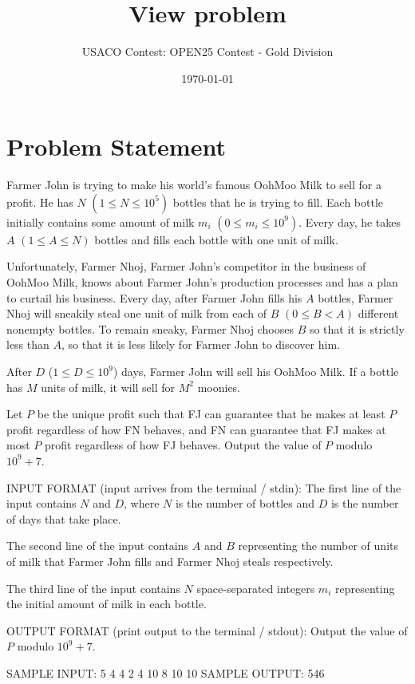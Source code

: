 \documentclass[12pt]{article}
\title{View problem}
\author{USACO Contest: OPEN25 Contest - Gold Division}
\date{\today}
\begin{document}
\maketitle

\section*{Problem Statement}


Farmer John is trying to make his world's famous OohMoo Milk to sell for a
profit. He has $N$ $(1 \leq N \leq 10^5)$ bottles that he is trying to fill.
Each bottle initially contains some amount of milk $m_i$
$(0 \leq m_i \leq 10^9)$. Every day, he takes $A$ $(1 \le A \le N)$ bottles and
fills each bottle with one unit of milk. 

Unfortunately, Farmer Nhoj, Farmer John's competitor in the business of OohMoo
Milk,  knows about Farmer John's production processes and has a plan to curtail
his business.  Every day, after Farmer John fills his $A$ bottles, Farmer Nhoj
will sneakily steal one unit of milk from each of $B$ $(0 \le B < A)$ different
nonempty bottles. To remain sneaky, Farmer Nhoj chooses $B$ so that it is
strictly less than $A$, so that it is less likely for Farmer John to discover
him.

After $D$ ($1 \leq D \leq 10^9$) days, Farmer John will sell his OohMoo Milk. If
a bottle has $M$ units of milk, it will sell for $M^2$ moonies. 

Let $P$ be the unique profit such that FJ can guarantee that he makes at least
$P$ profit  regardless of how FN behaves, and FN can guarantee that FJ makes at
most $P$ profit regardless of how  FJ behaves. Output the value of $P$ modulo
$10^9+7$.

INPUT FORMAT (input arrives from the terminal / stdin):
The first line of the input contains $N$ and $D$, where $N$ is the number of
bottles and $D$ is the number of days that take place.

The second line of the input contains $A$ and $B$ representing the number of
units of milk that Farmer John fills and Farmer Nhoj steals respectively.

The third line of the input contains $N$ space-separated integers $m_i$
representing the initial amount of milk in each bottle.


OUTPUT FORMAT (print output to the terminal / stdout):
Output the value of $P$ modulo $10^9+7$.

SAMPLE INPUT:
5 4
4 2
4 10 8 10 10
SAMPLE OUTPUT: 
546
\end{document}
